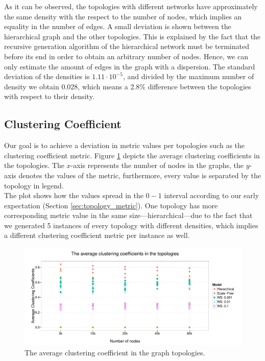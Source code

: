 As it can be observed, the topologies with different networks have approximately the same density with the respect to the number of nodes, which implies an equality in the number of edges. A small deviation is shown between the hierarchical graph and the other topologies. This is explained by the fact that the recursive generation algorithm of the hierarchical network must be terminated before its end in order to obtain an arbitrary number of nodes. Hence, we can only estimate the amount of edges in the graph with a dispersion. The standard deviation of the densities is $1.11 \cdot 10^{-5}$, and divided by the maximum number of density we obtain 0.028, which means a 2.8\% difference between the topologies with respect to their density.

\subsection{Clustering Coefficient}

Our goal is to achieve a deviation in metric values per topologies such as the clustering coefficient metric. Figure \ref{fig:clustering_metric} depicts the average clustering coefficients in the topologies. The $x$-axis represents the number of nodes in the graphs, the $y$-axis denotes the values of the metric, furthermore, every value is separated by the topology in legend.\\
The plot shows how the values spread in the $0-1$ interval according to our early expectation (Section \ref{sec:topology_metric}). One topology has more corresponding metric value in the same size---\eg hierarchical---due to the fact that we generated 5 instances of every topology with different densities, which implies a different clustering coefficient metric per instance as well.

\begin{figure}[!ht]
	\centering
	\includegraphics[width=160mm, keepaspectratio]{figures/clustering_metric.pdf}
	\caption{The average clustering coefficient in the graph topologies.}
	\label{fig:clustering_metric}
\end{figure}

